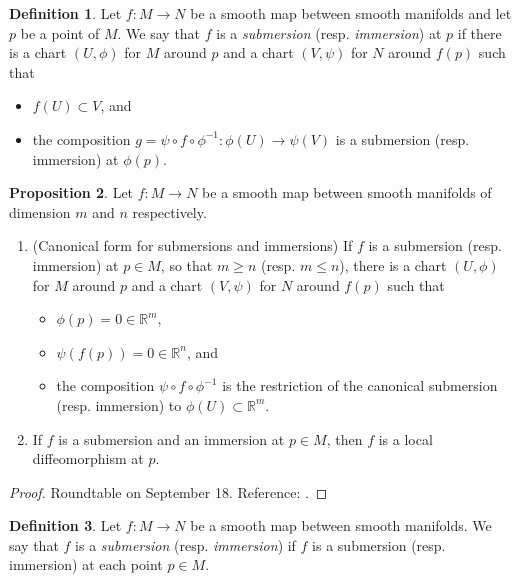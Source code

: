 \documentclass{amsart}
\numberwithin{equation}{section}
\newcommand{\bR}{\mathbb{R}}
\theoremstyle{definition}
\newtheorem{definition}{Definition} [section]
\theoremstyle{theorem}
\newtheorem{proposition}[definition]{Proposition}
\begin{document}
\begin{definition}\label{def:submersion}
Let $f : M \to N$ be a smooth map between smooth manifolds and let $p$ be a point of $M$. 
We say that $f$ is a {\em submersion} (resp. {\em immersion}) at $p$ if there is a chart 
$(U,\phi)$ for $M$ around $p$ and a chart $(V,\psi)$ for $N$ around $f(p)$ such that 
\begin{itemize}
\item $f(U) \subset V$, and 
\item the composition $g = \psi \circ f \circ \phi^{-1} : \phi(U) \to \psi(V)$ is a submersion 
(resp. immersion) at $\phi(p)$. 
\end{itemize}
\end{definition}

\begin{proposition} \label{prop:canonical-form}
Let $f : M \to N$ be a smooth map between smooth manifolds of dimension $m$ and $n$ respectively. 
\begin{enumerate}
\item (Canonical form for submersions and immersions) 
If $f$ is a submersion (resp. immersion) at $p \in M$, so that $m\geq n$ (resp. $m\leq n$),  
there is a chart $(U,\phi)$ for $M$ around $p$ and a chart $(V,\psi)$ for $N$ around $f(p)$ such that 
\begin{itemize}
\item $\phi(p) = 0\in \bR^m$,
\item $\psi(f(p)) = 0 \in \bR^n$, and 
\item the composition $\psi \circ f \circ \phi^{-1}$ is the restriction of 
the canonical submersion (resp. immersion) to $\phi(U) \subset \mathbb{R}^m$.  
\end{itemize}
\item If $f$ is a submersion and an immersion at $p \in M$, then $f$ is a local diffeomorphism at $p$. 
\end{enumerate}
\end{proposition}

\begin{proof} Roundtable on September 18. Reference: \cite[II.7, III.4]{Bo}.
\end{proof}

\begin{definition}
Let $f : M \to N$ be a smooth map between smooth manifolds. We say that $f$ is a 
{\em submersion} (resp. {\em immersion}) if $f$ is a submersion (resp. immersion) 
at each point $p \in M$. 
\end{definition}
\end{document}

